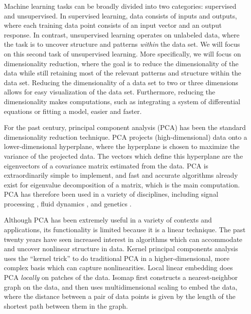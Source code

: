 Machine learning tasks can be broadly divided into two categories: supervised and unsupervised. 
%
In supervised learning, data consists of inputs and outputs, where each training data point consists of an input vector and an output response. 
%
In contrast, unsupervised learning operates on unlabeled data, where the task is to uncover structure and patterns {\em within} the data set. 
%
We will focus on this second task of unsupervised learning. 
%
More specifically, we will focus on dimensionality reduction, where the goal is to reduce the dimensionality of the data while still retaining most of the relevant patterns and structure within the data set. 
%
Reducing the dimensionality of a data set to two or three dimensions allows for easy visualization of the data set. 
%
Furthermore, reducing the dimensionality makes computations, such as integrating a system of differential equations or fitting a model, easier and faster. 

For the past century, principal component analysis (PCA) \cite{shlens2005tutorial} has been the standard dimensionality reduction technique.
%
PCA projects (high-dimensional) data onto a lower-dimensional hyperplane, where the hyperplane is chosen to maximize the variance of the projected data. 
%
The vectors which define this hyperplane are the eigenvectors of a covariance matrix estimated from the data. 
%
PCA is extraordinarily simple to implement, and fast and accurate algorithms already exist for eigenvalue decomposition of a matrix, which is the main computation.
%
PCA has therefore been used in a variety of disciplines, including signal processing \cite{...},  fluid dynamics \cite{...}, and genetics \cite{...}. 

Although PCA has been extremely useful in a variety of contexts and applications, its functionality is limited because it is a linear technique. 
%
The past twenty years have seen increased interest in algorithms which can accommodate and uncover nonlinear structure in data.
%
Kernel principal components analysis \cite{scholkopf1997kernel} uses the ``kernel trick'' to do traditional PCA in a higher-dimensional, more complex basis which can capture nonlinearities. 
%
Local linear embedding \cite{roweis2000nonlinear} does PCA {\em locally} on patches of the data. 
%
Isomap \cite{tenenbaum2000global} first constructs a nearest-neighbor graph on the data, and then uses multidimensional scaling \cite{joseph1978multidimensional} to embed the data, where the distance between a pair of data points is given by the length of the shortest path between them in the graph. 


